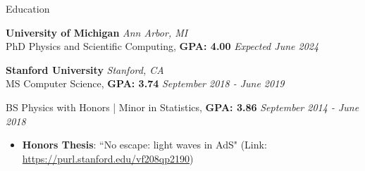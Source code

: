 \documentclass{resume} %
\begin{document}
\begin{rSection}{Education}

{\bf University of Michigan} \hfill {\em Ann Arbor, MI} 
\\ PhD Physics and Scientific Computing, \textbf{GPA: 4.00} \hfill {\em Expected June 2024}
\vspace*{-0.1cm}
%

{\bf Stanford University} \hfill {\em Stanford, CA} 
\\ MS Computer Science, \textbf{GPA: 3.74} \hfill {\em September 2018 - June 2019}

BS Physics with Honors | Minor in Statistics, \textbf{GPA: 3.86} \hfill {\em September 2014 - June 2018}
%
\vspace*{-0.1cm}
\begin{itemize}[itemsep=-0.25em] 

    \item 
    \textbf{Honors Thesis}: ``No escape: light waves in AdS" (Link: \url{https://purl.stanford.edu/vf208qp2190})  

\end{itemize}
%
\vspace*{-0.1cm}
\end{rSection}
\end{document}
